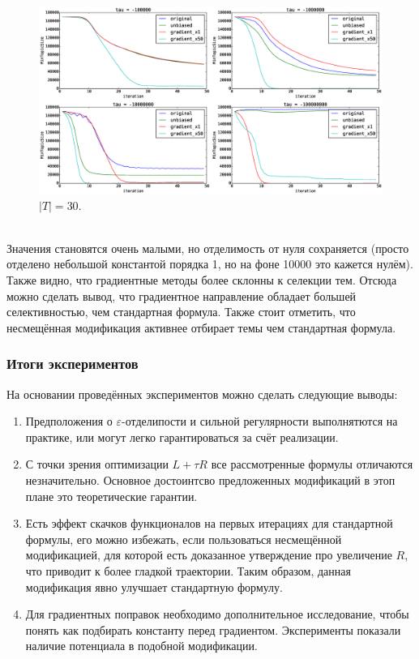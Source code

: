 \documentclass[12pt]{article}
\begin{document}
\begin{figure}[H]
	\centering
	\caption{$|T| = 30$.}    
	\includegraphics[width=1.0\linewidth]{pictures/topics_30_MinTopicSize}
\end{figure}
\ \\
Значения становятся очень малыми, но отделимость от нуля сохраняется (просто отделено небольшой константой порядка 1, но на фоне 10000 это кажется нулём). \\
Также видно, что градиентные методы более склонны к селекции тем. Отсюда можно сделать вывод, что градиентное направление обладает большей селективностью, чем стандартная формула. Также стоит отметить, что несмещённая модификация активнее отбирает темы чем стандартная формула.
\subsubsection{Итоги экспериментов}
На основании проведённых экспериментов можно сделать следующие выводы:
\begin{enumerate}
\item Предположения о $\varepsilon$-отделипости и сильной регулярности выполнятются на практике, или могут легко гарантироваться за счёт реализации.
\item С точки зрения оптимизации $L + \tau R$ все рассмотренные формулы отличаются незначительно. Основное достоинтсво предложенных модификаций в этоп плане это теоретические гарантии.
\item Есть эффект скачков функционалов на первых итерациях для стандартной формулы, его можно избежать, если пользоваться несмещённой модификацией, для которой есть доказанное утверждение про увеличение $R$, что приводит к более гладкой траектории. Таким образом, данная модификация явно улучшает стандартную формулу.
\item Для градиентных поправок необходимо дополнительное исследование, чтобы понять как подбирать константу перед градиентом. Эксперименты показали наличие потенциала в подобной модификации.
\end{enumerate}
\end{document}
